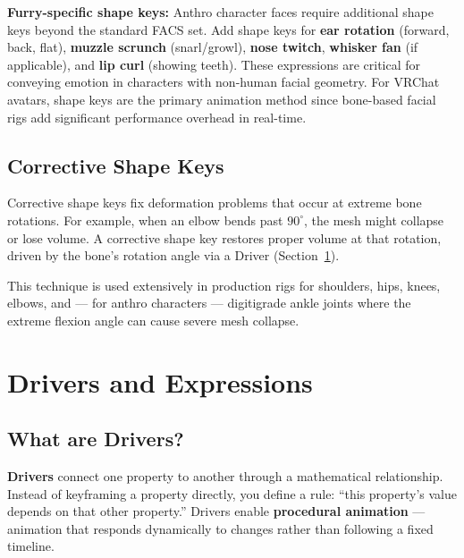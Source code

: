 \begin{furrybox}
\textbf{Furry-specific shape keys:} Anthro character faces require additional shape keys beyond the standard FACS set. Add shape keys for \textbf{ear rotation} (forward, back, flat), \textbf{muzzle scrunch} (snarl/growl), \textbf{nose twitch}, \textbf{whisker fan} (if applicable), and \textbf{lip curl} (showing teeth). These expressions are critical for conveying emotion in characters with non-human facial geometry. For VRChat avatars, shape keys are the primary animation method since bone-based facial rigs add significant performance overhead in real-time.
\end{furrybox}

\subsection{Corrective Shape Keys}
\label{subsec:corrective-shapes}

Corrective shape keys fix deformation problems that occur at extreme bone rotations. For example, when an elbow bends past $90^\circ$, the mesh might collapse or lose volume. A corrective shape key restores proper volume at that rotation, driven by the bone's rotation angle via a Driver (Section~\ref{sec:drivers}).

This technique is used extensively in production rigs for shoulders, hips, knees, elbows, and --- for anthro characters --- digitigrade ankle joints where the extreme flexion angle can cause severe mesh collapse.


\section{Drivers and Expressions}
\label{sec:drivers}

\subsection{What are Drivers?}

\textbf{Drivers} connect one property to another through a mathematical relationship. Instead of keyframing a property directly, you define a rule: ``this property's value depends on that other property.'' Drivers enable \textbf{procedural animation} --- animation that responds dynamically to changes rather than following a fixed timeline.

